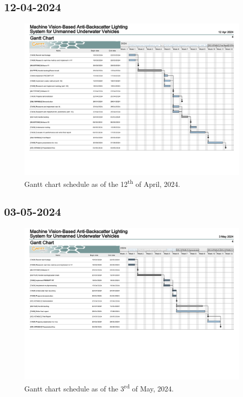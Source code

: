 \subsection{12-04-2024}

\begin{figure}[H]
    \centering
    \includegraphics[width=1\textwidth]{assets/gantt3.png}
    \caption{Gantt chart schedule as of the 12\textsuperscript{th} of April, 2024.}
    \label{fig:gantt3}
\end{figure}

\subsection{03-05-2024}

\begin{figure}[H]
    \centering
    \includegraphics[width=1\textwidth]{assets/gantt4.png}
    \caption{Gantt chart schedule as of the 3\textsuperscript{rd} of May, 2024.}
    \label{fig:gantt4}
\end{figure}